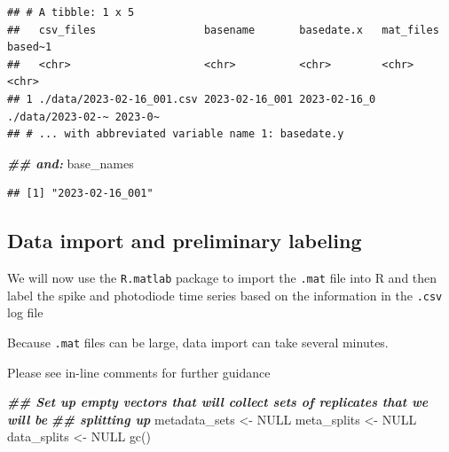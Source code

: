 \documentclass[
]{book}
\newenvironment{Shaded}{\begin{snugshade}}{\end{snugshade}}
\newcommand{\ConstantTok}[1]{\textcolor[rgb]{0.00,0.00,0.00}{#1}}
\newcommand{\DocumentationTok}[1]{\textcolor[rgb]{0.56,0.35,0.01}{\textbf{\textit{#1}}}}
\newcommand{\FunctionTok}[1]{\textcolor[rgb]{0.00,0.00,0.00}{#1}}
\newcommand{\NormalTok}[1]{#1}
\newcommand{\OtherTok}[1]{\textcolor[rgb]{0.56,0.35,0.01}{#1}}
\newcommand{\SpecialCharTok}[1]{\textcolor[rgb]{0.00,0.00,0.00}{#1}}
\begin{document}
\begin{Shaded}
\end{Shaded}

\begin{verbatim}
## # A tibble: 1 x 5
##   csv_files                 basename       basedate.x   mat_files        based~1
##   <chr>                     <chr>          <chr>        <chr>            <chr>  
## 1 ./data/2023-02-16_001.csv 2023-02-16_001 2023-02-16_0 ./data/2023-02-~ 2023-0~
## # ... with abbreviated variable name 1: basedate.y
\end{verbatim}

\begin{Shaded}
\begin{Highlighting}[]
\DocumentationTok{\#\# and:}
\NormalTok{base\_names}
\end{Highlighting}
\end{Shaded}

\begin{verbatim}
## [1] "2023-02-16_001"
\end{verbatim}

\hypertarget{data-import-and-preliminary-labeling}{%
\subsection{Data import and preliminary labeling}\label{data-import-and-preliminary-labeling}}

We will now use the \texttt{R.matlab} package to import the \texttt{.mat} file into
R and then label the spike and photodiode time series based on the
information in the \texttt{.csv} log file

Because \texttt{.mat} files can be large, data import can take several
minutes.

Please see in-line comments for further guidance

\begin{Shaded}
\begin{Highlighting}[]
\DocumentationTok{\#\# Set up empty vectors that will collect sets of replicates that we will be}
\DocumentationTok{\#\# splitting up}
\NormalTok{metadata\_sets }\OtherTok{\textless{}{-}} \ConstantTok{NULL}
\NormalTok{meta\_splits }\OtherTok{\textless{}{-}} \ConstantTok{NULL}
\NormalTok{data\_splits }\OtherTok{\textless{}{-}} \ConstantTok{NULL}
\FunctionTok{gc}\NormalTok{()}
\end{Highlighting}
\end{Shaded}
\end{document}
